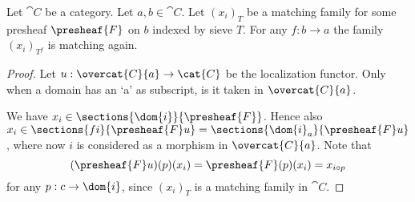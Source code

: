 \begin{lemma}
Let $\cat{C}$ be a category.
Let $a,b\in \cat{C}$.
Let $(x_i)_T$ be a matching family for some presheaf $\presheaf{F}$ on $b$
indexed by sieve $T$.
For any $f:b \rightarrow a$ the family
$(x_i)_{T^f}$ is matching again.
\end{lemma}

\begin{proof}
Let $u: \overcat{C}{a} \rightarrow \cat{C}$ be the localization functor.
Only when a domain has an `a' as subscript, is it taken in $\overcat{C}{a}$.

We have $x_{i} \in \sections{\dom{i}}{\presheaf{F}}$.
Hence also $x_{i} \in \sections{fi}{\presheaf{F}u} = \sections{\dom{i}_a}{\presheaf{F}u}$,
where now $i$ is considered as a morphism in $\overcat{C}{a}$.
Note that 
\[(\presheaf{F}u)(p)(x_{i}) 
	= \presheaf{F}(p)(x_{i}) =x_{i \circ p}
\]
for any $p:c \rightarrow \dom{i}$,
since $(x_{i})_T$ is a matching family in $\cat{C}$.
\end{proof}